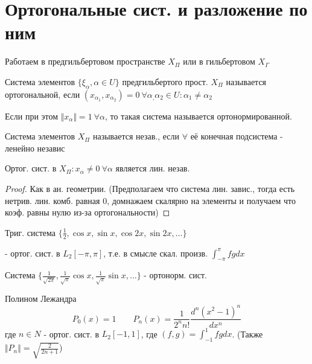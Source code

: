 \documentclass{article}
\begin{document}
\section{Ортогональные сист. и разложение по ним}
Работаем в предгильбертовом пространстве $X_{\Pi}$ или в гильбертовом $X_{\Gamma}$
\begin{definition}
Система элементов $\{\xi_{\alpha}, \alpha \in U\}$ предгильбертого прост. $X_{\Pi}$
называется ортогональной, если $(x_{\alpha_1}, x_{\alpha_2})=0 \  \forall \alpha_,\alpha_2 \in U: \alpha_1 \neq \alpha_2$

Если при этом $\Vert x_\alpha \Vert=1 \ \forall \alpha$, то такая система называется ортонормированной.
\end{definition}
\begin{definition}
  Система элементов $X_{\Pi}$ называется незав., если $\forall $ её конечная подсистема
  - ленейно независ
\end{definition}
\begin{lemma}
  Ортог. сист. в $X_{\Pi}: x_\alpha \neq 0 \ \forall \alpha$ является лин. незав. 
\end{lemma}
\begin{proof}
  Как в ан. геометрии. (Предполагаем что система лин. завис., тогда есть нетрив. лин. комб. равная 0, 
  домнажаем скалярно на элементы и получаем что коэф. равны нулю из-за ортогональности)
\end{proof}
\begin{eg}
  Триг. система $\{\frac{1}{2}, \cos x, \sin x, \cos 2x, \sin 2x,\dots \}$ 

  - ортог. сист. в $L_2[-\pi,\pi]$, т.е. в смысле скал. произв. $\int_{-\pi}^{\pi}fgdx$

  Система $\{\frac{1}{\sqrt{2\pi}}, \frac{1}{\sqrt{\pi}}\cos x,\frac{1}{\sqrt{\pi}}\sin x,\dots  \}$ - ортонорм. сист.
\end{eg}
\begin{eg}
  Полином Лежандра
  \[
    P_0(x)=1 \qquad P_n(x)=\frac{1}{2^{n}n!}\frac{d^{n}(x^{2}-1)^{n}}{dx^{n}}
  \]
  где $ n \in N$ - ортог. сист. в $L_2[-1,1]$, где $(f,g)=\int_{-1}^{1}fgdx$. (Также $\Vert P_n \Vert=\sqrt{\frac{2}{2n+1}}$)
\end{eg}
\end{document}

